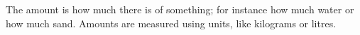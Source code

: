 The amount is how much there is of something; for instance how much 
water or how much sand. Amounts are measured using units, like kilograms 
or litres.